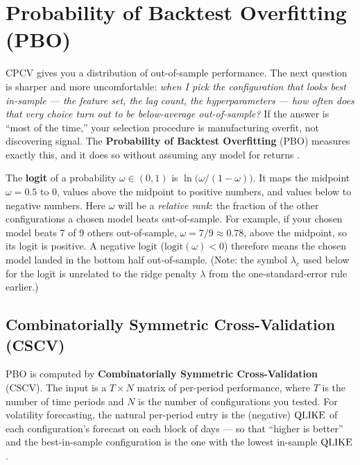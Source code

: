 \section{Probability of Backtest Overfitting (PBO)}
\label{sec:ch16:pbo}

CPCV gives you a distribution of out-of-sample performance.
The next question is sharper and more uncomfortable: \emph{when I pick the configuration that looks best in-sample --- the feature set, the lag count, the hyperparameters --- how often does that very choice turn out to be below-average out-of-sample?}
If the answer is ``most of the time,'' your selection procedure is manufacturing overfit, not discovering signal.
The \textbf{Probability of Backtest Overfitting} (PBO) measures exactly this, and it does so without assuming any model for returns \citep{Bailey2014PBO}.

\begin{prereq}
The \textbf{logit} of a probability $\omega \in (0,1)$ is $\ln\!\bigl(\omega/(1-\omega)\bigr)$.
It maps the midpoint $\omega = 0.5$ to $0$, values above the midpoint to positive numbers, and values below to negative numbers.
Here $\omega$ will be a \emph{relative rank}: the fraction of the other configurations a chosen model beats out-of-sample. For example, if your chosen model beats 7 of 9 others out-of-sample, $\omega = 7/9 \approx 0.78$, above the midpoint, so its logit is positive.
A negative logit ($\text{logit}(\omega) < 0$) therefore means the chosen model landed in the bottom half out-of-sample.
(Note: the symbol $\lambda_c$ used below for the logit is unrelated to the ridge penalty $\lambda$ from the one-standard-error rule earlier.)
\end{prereq}

\subsection{Combinatorially Symmetric Cross-Validation (CSCV)}

PBO is computed by \textbf{Combinatorially Symmetric Cross-Validation} (CSCV).
The input is a $T \times N$ matrix of per-period performance, where $T$ is the number of time periods and $N$ is the number of configurations you tested.
For volatility forecasting, the natural per-period entry is the (negative) $\operatorname{QLIKE}$ of each configuration's forecast on each block of days --- so that ``higher is better'' and the best-in-sample configuration is the one with the lowest in-sample $\operatorname{QLIKE}$.

